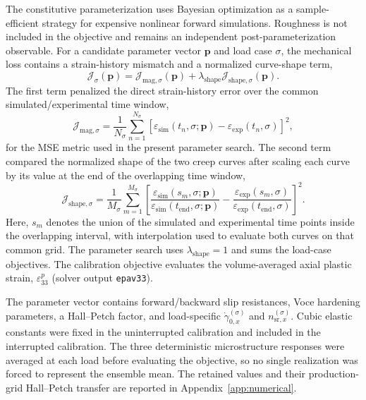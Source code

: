 \documentclass[final,12pt]{cas-sc}
\begin{document}
The constitutive parameterization uses Bayesian optimization as a sample-efficient strategy for expensive nonlinear forward simulations. Roughness is not included in the objective and remains an independent post-parameterization observable. For a candidate parameter vector $\mathbf{p}$ and load case $\sigma$, the mechanical loss contains a strain-history mismatch and a normalized curve-shape term,
\begin{equation}
    \mathcal{J}_{\sigma}(\mathbf{p})
    =
    \mathcal{J}_{\mathrm{mag},\sigma}(\mathbf{p})
    +
    \lambda_{\mathrm{shape}}
    \mathcal{J}_{\mathrm{shape},\sigma}(\mathbf{p}) .
\end{equation}
The first term penalized the direct strain-history error over the common simulated/experimental time window,
\begin{equation}
    \mathcal{J}_{\mathrm{mag},\sigma}
    =
    \frac{1}{N_{\sigma}}
    \sum_{n=1}^{N_{\sigma}}
    \left[
    \varepsilon_{\mathrm{sim}}(t_n,\sigma;\mathbf{p})
    -
    \varepsilon_{\mathrm{exp}}(t_n,\sigma)
    \right]^2 ,
\end{equation}
for the MSE metric used in the present parameter search. The second term compared the normalized shape of the two creep curves after scaling each curve by its value at the end of the overlapping time window,
\begin{equation}
    \mathcal{J}_{\mathrm{shape},\sigma}
    =
    \frac{1}{M_{\sigma}}
    \sum_{m=1}^{M_{\sigma}}
    \left[
    \frac{\varepsilon_{\mathrm{sim}}(s_m,\sigma;\mathbf{p})}
         {\varepsilon_{\mathrm{sim}}(t_{\mathrm{end}},\sigma;\mathbf{p})}
    -
    \frac{\varepsilon_{\mathrm{exp}}(s_m,\sigma)}
         {\varepsilon_{\mathrm{exp}}(t_{\mathrm{end}},\sigma)}
    \right]^2 .
\end{equation}
Here, $s_m$ denotes the union of the simulated and experimental time points inside the overlapping interval, with interpolation used to evaluate both curves on that common grid. The parameter search uses $\lambda_{\mathrm{shape}}=1$ and sums the load-case objectives. The calibration objective evaluates the volume-averaged axial plastic strain, $\varepsilon_{33}^p$ (solver output \texttt{epav33}).

The parameter vector contains forward/backward slip resistances, Voce
hardening parameters, a Hall--Petch factor, and load-specific
$\dot{\gamma}_{0,x}^{(\sigma)}$ and $n_{\mathrm{sr},x}^{(\sigma)}$.
Cubic elastic constants were fixed in the uninterrupted calibration and
included in the interrupted calibration. The three deterministic
microstructure responses were averaged at each load before evaluating the
objective, so no single realization was forced to represent the ensemble
mean. The retained values and their production-grid Hall--Petch transfer are
reported in Appendix~\ref{app:numerical}.
\end{document}
